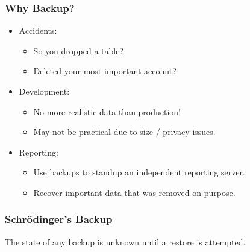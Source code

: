 \begin{frame}
    \frametitle{Why Backup?}

    \begin{itemize}
        \item Accidents:

        \begin{itemize}
            \item So you dropped a table?\pause
            \item Deleted your most important account?\pause
        \end{itemize}

        \item Development:

        \begin{itemize}
            \item No more realistic data than production!\pause
            \item May not be practical due to size / privacy issues.\pause
        \end{itemize}

        \item Reporting:

        \begin{itemize}
            \item Use backups to standup an independent reporting server.\pause
            \item Recover important data that was removed on purpose.
        \end{itemize}
    \end{itemize}
\end{frame}

\begin{frame}
    \frametitle{Schr\"{o}dinger’s Backup}

    \Large The state of any backup is unknown until a restore is attempted.
\end{frame}


